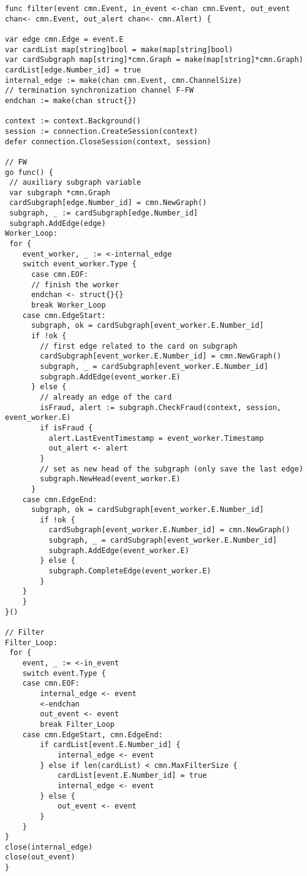 \newpage
\begin{center}
\lstset{style=golangStyle}
\begin{lstlisting}[caption={A \filter\ stage \texttt{Go} implementation}, label={lst:filterImplementation}]
func filter(event cmn.Event, in_event <-chan cmn.Event, out_event chan<- cmn.Event, out_alert chan<- cmn.Alert) {

var edge cmn.Edge = event.E
var cardList map[string]bool = make(map[string]bool)
var cardSubgraph map[string]*cmn.Graph = make(map[string]*cmn.Graph)
cardList[edge.Number_id] = true
internal_edge := make(chan cmn.Event, cmn.ChannelSize)
// termination synchronization channel F-FW
endchan := make(chan struct{}) 

context := context.Background() 
session := connection.CreateSession(context)
defer connection.CloseSession(context, session)

// FW 
go func() {
 // auxiliary subgraph variable
 var subgraph *cmn.Graph 
 cardSubgraph[edge.Number_id] = cmn.NewGraph()
 subgraph, _ := cardSubgraph[edge.Number_id]
 subgraph.AddEdge(edge)
Worker_Loop:
 for {
    event_worker, _ := <-internal_edge
    switch event_worker.Type {
      case cmn.EOF:
      // finish the worker
      endchan <- struct{}{}
      break Worker_Loop
    case cmn.EdgeStart:
      subgraph, ok = cardSubgraph[event_worker.E.Number_id]
      if !ok {
        // first edge related to the card on subgraph
        cardSubgraph[event_worker.E.Number_id] = cmn.NewGraph()
        subgraph, _ = cardSubgraph[event_worker.E.Number_id]
        subgraph.AddEdge(event_worker.E)
      } else {
        // already an edge of the card
        isFraud, alert := subgraph.CheckFraud(context, session, event_worker.E)
        if isFraud {
          alert.LastEventTimestamp = event_worker.Timestamp
          out_alert <- alert
        }
        // set as new head of the subgraph (only save the last edge)
        subgraph.NewHead(event_worker.E)
      }
    case cmn.EdgeEnd:
      subgraph, ok = cardSubgraph[event_worker.E.Number_id]
        if !ok {
          cardSubgraph[event_worker.E.Number_id] = cmn.NewGraph()
          subgraph, _ = cardSubgraph[event_worker.E.Number_id]
          subgraph.AddEdge(event_worker.E)
        } else {
          subgraph.CompleteEdge(event_worker.E)
        }
    }
    }
}()

// Filter
Filter_Loop:
 for {
    event, _ := <-in_event
    switch event.Type {
    case cmn.EOF:
        internal_edge <- event
        <-endchan
        out_event <- event 
        break Filter_Loop
    case cmn.EdgeStart, cmn.EdgeEnd:
        if cardList[event.E.Number_id] {
            internal_edge <- event
        } else if len(cardList) < cmn.MaxFilterSize {
            cardList[event.E.Number_id] = true
            internal_edge <- event
        } else {
            out_event <- event
        }
    }
}
close(internal_edge)
close(out_event)
}
\end{lstlisting}
\end{center}


